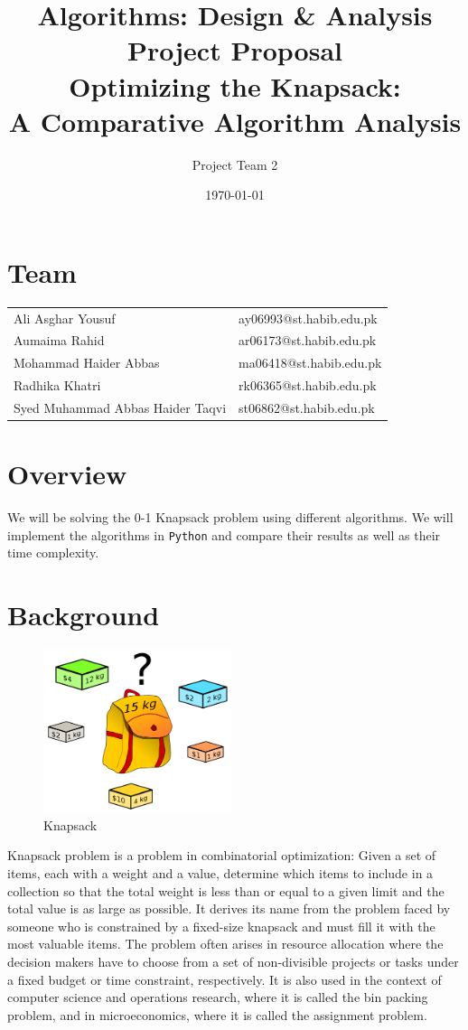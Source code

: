 \documentclass{article}
\title{Algorithms: Design \& Analysis Project Proposal \\
        \large Optimizing the Knapsack: \\
        A Comparative Algorithm Analysis}
\author{Project Team 2}
\date{\today}
\begin{document}
\maketitle

\section*{Team}
\begin{tabular}{ l l }
    Ali Asghar Yousuf & ay06993@st.habib.edu.pk \\ 
    Aumaima Rahid & ar06173@st.habib.edu.pk \\ 
    Mohammad Haider Abbas & ma06418@st.habib.edu.pk \\
    Radhika Khatri & rk06365@st.habib.edu.pk \\
    Syed Muhammad Abbas Haider Taqvi & st06862@st.habib.edu.pk 
   \end{tabular}
\section*{Overview}
We will be solving the 0-1 Knapsack problem using different algorithms. We will implement the algorithms in \texttt{Python} and compare their results as well as their time complexity.
\section*{Background}
\begin{figure}
\caption{Knapsack}\label{wrap-fig:1}
\includegraphics[width=5.5cm]{knapsack.png}
\end{figure} 
Knapsack problem is a problem in combinatorial optimization: Given a set of items, each with a weight and a value, determine which items to include in a collection so that the total weight is less than or equal to a given limit and the total value is as large as possible.
It derives its name from the problem faced by someone who is constrained by a fixed-size knapsack and must fill it with the most valuable items. The problem often arises in resource allocation where the decision makers have to choose from a set of non-divisible projects or tasks under a fixed budget or time constraint, respectively.
It is also used in the context of computer science and operations research, where it is called the bin packing problem, and in microeconomics, where it is called the assignment problem.
\end{document}
